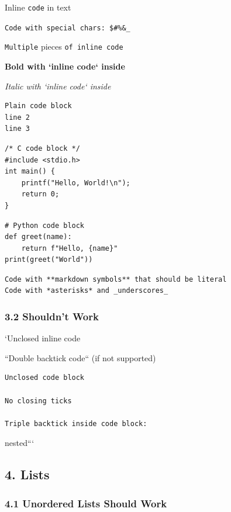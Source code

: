 \documentclass{article}
\begin{document}
Inline \texttt{code} in text

\texttt{Code with special chars: \$\#\%\&\_}

\texttt{Multiple} pieces \texttt{of inline code}

\textbf{Bold with `inline code` inside}

\emph{Italic with `inline code` inside}

\begin{verbatim}
Plain code block
line 2
line 3
\end{verbatim}

\begin{verbatim}
/* C code block */
#include <stdio.h>
int main() {
    printf("Hello, World!\n");
    return 0;
}
\end{verbatim}

\begin{verbatim}
# Python code block
def greet(name):
    return f"Hello, {name}"
print(greet("World"))
\end{verbatim}

\begin{verbatim}
Code with **markdown symbols** that should be literal
Code with *asterisks* and _underscores_
\end{verbatim}

\subsubsection{ 3.2 Shouldn't Work}

`Unclosed inline code

``Double backtick code`` (if not supported)

\begin{verbatim}
Unclosed code block

No closing ticks

Triple backtick inside code block:
\end{verbatim}

nested```

\noindent\hrulefill

\subsection{ 4. Lists}

\subsubsection{ 4.1 Unordered Lists Should Work}
\end{document}

